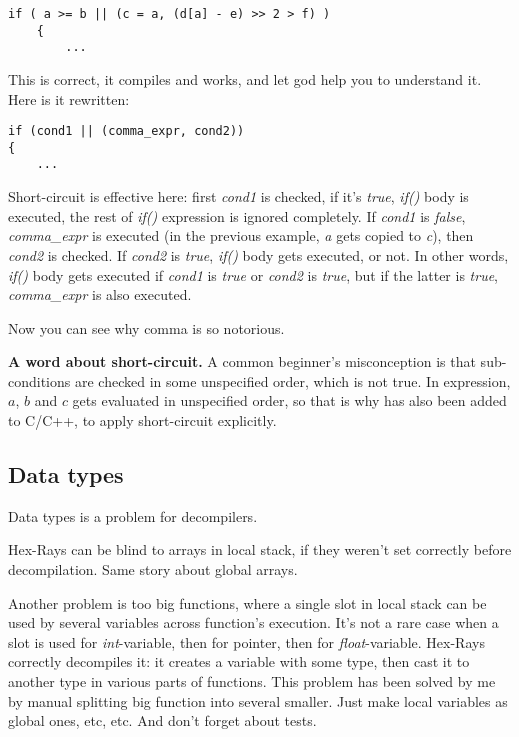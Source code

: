 \begin{lstlisting}[style=customc]
 if ( a >= b || (c = a, (d[a] - e) >> 2 > f) )
    {
    	...
\end{lstlisting}

This is correct, it compiles and works, and let god help you to understand it.
Here is it rewritten:

\begin{lstlisting}[style=customc]
if (cond1 || (comma_expr, cond2))
{
	...
\end{lstlisting}

Short-circuit is effective here: first \emph{cond1} is checked, if it's \emph{true}, \emph{if()} body is executed, the rest
of \emph{if()} expression is ignored completely.
If \emph{cond1} is \emph{false}, \emph{comma\_expr} is executed (in the previous example, \emph{a} gets copied to \emph{c}),
then \emph{cond2} is checked.
If \emph{cond2} is \emph{true}, \emph{if()} body gets executed, or not.
In other words, \emph{if()} body gets executed if \emph{cond1} is \emph{true} or \emph{cond2} is \emph{true},
but if the latter is \emph{true}, \emph{comma\_expr} is also executed.

Now you can see why comma is so notorious.

\textbf{A word about short-circuit.}
A common beginner's misconception is that sub-conditions are checked in some unspecified order, which is not true.
In  expression, $a$, $b$ and $c$ gets evaluated in unspecified order, so that is why \TT{||} has also been
added to C/C++, to apply short-circuit explicitly.

\subsection{Data types}

Data types is a problem for decompilers.

Hex-Rays can be blind to arrays in local stack, if they weren't set correctly before decompilation.
Same story about global arrays.

Another problem is too big functions, where a single slot in local stack can be used by several variables
across function's execution.
It's not a rare case when a slot is used for \emph{int}-variable, then for pointer, then for \emph{float}-variable.
Hex-Rays correctly decompiles it: it creates a variable with some type, then cast it to another type in various
parts of functions.
This problem has been solved by me by manual splitting big function into several smaller.
Just make local variables as global ones, etc, etc.
And don't forget about tests.

